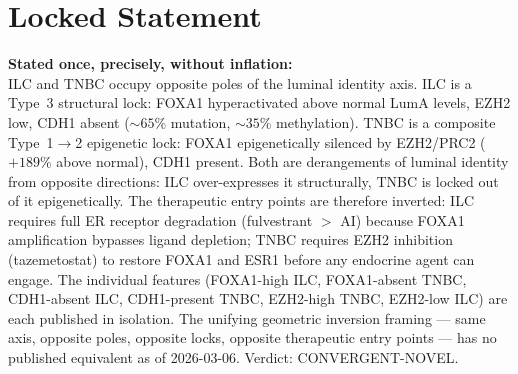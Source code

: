 \documentclass[12pt, a4paper]{article}
\begin{document}
\section{Locked Statement}

\begin{center}
\colorbox{findingbox}{
\begin{minipage}{0.88\textwidth}
\vspace{0.6em}
\textbf{Stated once, precisely, without
inflation:}\\[0.5em]
ILC and TNBC occupy opposite poles of the luminal
identity axis. ILC is a Type~3 structural lock:
FOXA1 hyperactivated above normal LumA levels,
EZH2 low, CDH1 absent (${\sim}65\%$ mutation,
${\sim}35\%$ methylation). TNBC is a composite
Type~1$\rightarrow$2 epigenetic lock: FOXA1
epigenetically silenced by EZH2/PRC2
($+189\%$ above normal), CDH1 present. Both are
derangements of luminal identity from opposite
directions: ILC over-expresses it structurally,
TNBC is locked out of it epigenetically. The
therapeutic entry points are therefore inverted:
ILC requires full ER receptor degradation
(fulvestrant $>$ AI) because FOXA1 amplification
bypasses ligand depletion; TNBC requires EZH2
inhibition (tazemetostat) to restore FOXA1 and
ESR1 before any endocrine agent can engage. The
individual features (FOXA1-high ILC, FOXA1-absent
TNBC, CDH1-absent ILC, CDH1-present TNBC, EZH2-high
TNBC, EZH2-low ILC) are each published in isolation.
The unifying geometric inversion framing --- same
axis, opposite poles, opposite locks, opposite
therapeutic entry points --- has no published
equivalent as of 2026-03-06. Verdict:
CONVERGENT-NOVEL.
\vspace{0.5em}
\end{minipage}}
\end{center}
\end{document}
